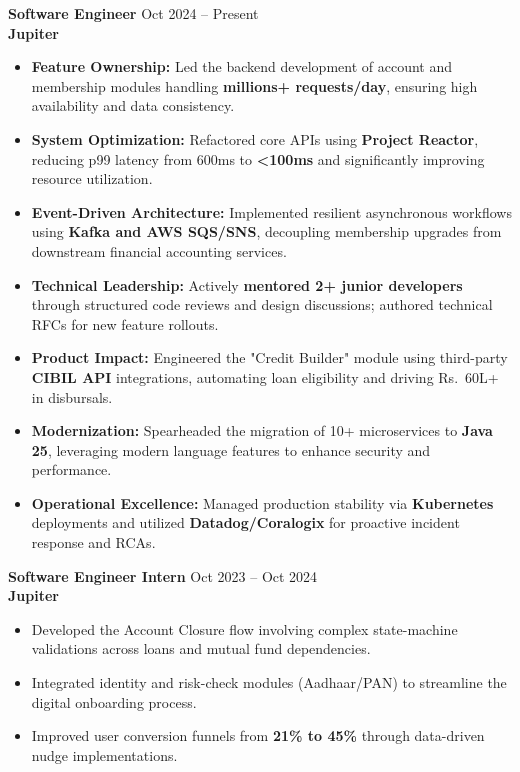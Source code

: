 \documentclass[a4paper,10pt]{article}
\begin{document}
\textbf{Software Engineer} \hfill Oct 2024 -- Present \\
\textbf{Jupiter}
\begin{itemize}[leftmargin=*, itemsep=2pt, topsep=2pt]
    \item \textbf{Feature Ownership:} Led the backend development of account and membership modules handling \textbf{millions+ requests/day}, ensuring high availability and data consistency.
    \item \textbf{System Optimization:} Refactored core APIs using \textbf{Project Reactor}, reducing p99 latency from 600ms to \textbf{<100ms} and significantly improving resource utilization.
    \item \textbf{Event-Driven Architecture:} Implemented resilient asynchronous workflows using \textbf{Kafka and AWS SQS/SNS}, decoupling membership upgrades from downstream financial accounting services.
    \item \textbf{Technical Leadership:} Actively \textbf{mentored 2+ junior developers} through structured code reviews and design discussions; authored technical RFCs for new feature rollouts.
    \item \textbf{Product Impact:} Engineered the "Credit Builder" module using third-party \textbf{CIBIL API} integrations, automating loan eligibility and driving Rs.\ 60L+ in disbursals.
    \item \textbf{Modernization:} Spearheaded the migration of 10+ microservices to \textbf{Java 25}, leveraging modern language features to enhance security and performance.
    \item \textbf{Operational Excellence:} Managed production stability via \textbf{Kubernetes} deployments and utilized \textbf{Datadog/Coralogix} for proactive incident response and RCAs.
\end{itemize}

\textbf{Software Engineer Intern} \hfill Oct 2023 -- Oct 2024 \\
\textbf{Jupiter}
\begin{itemize}[leftmargin=*, itemsep=2pt, topsep=2pt]
    \item Developed the Account Closure flow involving complex state-machine validations across loans and mutual fund dependencies.
    \item Integrated identity and risk-check modules (Aadhaar/PAN) to streamline the digital onboarding process.
    \item Improved user conversion funnels from \textbf{21\% to 45\%} through data-driven nudge implementations.
\end{itemize}
\end{document}
